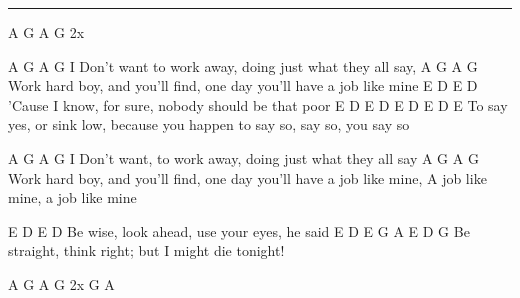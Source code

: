 \noindent\rule{\columnwidth}{1pt}

\begin{lstsong}
A G A G  2x

  A             G          A                    G
I Don't want to work away, doing just what they all say,
A                  G            A                     G
Work hard boy, and you'll find, one day you'll have a job like mine
       E       D         E                D
'Cause I know, for sure, nobody should be that poor
   E           D                     E         D   E   D   E       D   E
To say yes, or sink low, because you happen to say so, say so, you say so


  A              G          A                    G
I Don't want, to work away, doing just what they all say
A                  G            A                     G
Work hard boy, and you'll find, one day you'll have a job like mine, 
                          A
job like mine, a job like mine

E        D           E              D
Be wise, look ahead, use your eyes, he said
E            D            E           G      A  E  D G
Be straight, think right; but I might die tonight!

A G A  G  2x
G
A
\end{lstsong}
\newpage
